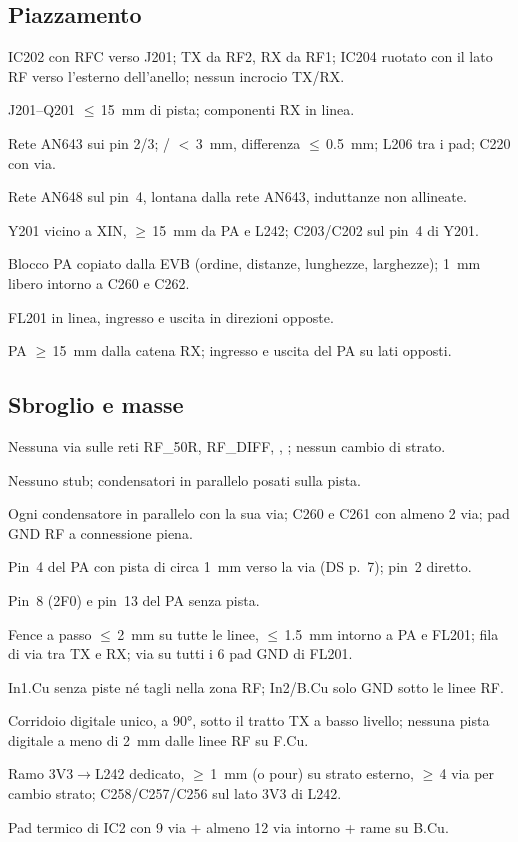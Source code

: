 \documentclass[a4paper,10pt]{article}
\newcommand{\net}[1]{\texttt{\detokenize{#1}}}
\begin{document}
\subsection*{Piazzamento}
\begin{checklist}
\item IC202 con RFC verso J201; TX da RF2, RX da RF1; IC204 ruotato con il lato RF verso l'esterno
      dell'anello; nessun incrocio TX/RX.
\item J201--Q201 $\le$\,\SI{15}{mm} di pista; componenti RX in linea.
\item Rete AN643 sui pin 2/3; \net{RF_RX_P}/\net{RF_RX_N} $<$\,\SI{3}{mm}, differenza $\le$\,\SI{0.5}{mm};
      L206 tra i pad; C220 con via.
\item Rete AN648 sul pin~4, lontana dalla rete AN643, induttanze non allineate.
\item Y201 vicino a XIN, $\ge$\,\SI{15}{mm} da PA e L242; C203/C202 sul pin~4 di Y201.
\item Blocco PA copiato dalla EVB (ordine, distanze, lunghezze, larghezze); \SI{1}{mm} libero intorno a C260 e C262.
\item FL201 in linea, ingresso e uscita in direzioni opposte.
\item PA $\ge$\,\SI{15}{mm} dalla catena RX; ingresso e uscita del PA su lati opposti.
\end{checklist}
\subsection*{Sbroglio e masse}
\begin{checklist}
\item Nessuna via sulle reti RF\_50R, RF\_DIFF, \net{RF_PA_OUT}, \net{RF_PA_MATCH}; nessun cambio di strato.
\item Nessuno stub; condensatori in parallelo posati sulla pista.
\item Ogni condensatore in parallelo con la sua via; C260 e C261 con almeno 2 via; pad GND RF a connessione piena.
\item Pin~4 del PA con pista di circa \SI{1}{mm} verso la via (DS p.~7); pin~2 diretto.
\item Pin~8 (2F0) e pin~13 del PA senza pista.
\item Fence a passo $\le$\,\SI{2}{mm} su tutte le linee, $\le$\,\SI{1.5}{mm} intorno a PA e FL201; fila di
      via tra TX e RX; via su tutti i 6 pad GND di FL201.
\item In1.Cu senza piste né tagli nella zona RF; In2/B.Cu solo GND sotto le linee RF.
\item Corridoio digitale unico, a \ang{90}, sotto il tratto TX a basso livello; nessuna pista digitale a
      meno di \SI{2}{mm} dalle linee RF su F.Cu.
\item Ramo 3V3$\rightarrow$L242 dedicato, $\ge$\,\SI{1}{mm} (o pour) su strato esterno, $\ge$\,4 via per
      cambio strato; C258/C257/C256 sul lato 3V3 di L242.
\item Pad termico di IC2 con 9 via + almeno 12 via intorno + rame su B.Cu.
\end{checklist}
\end{document}

